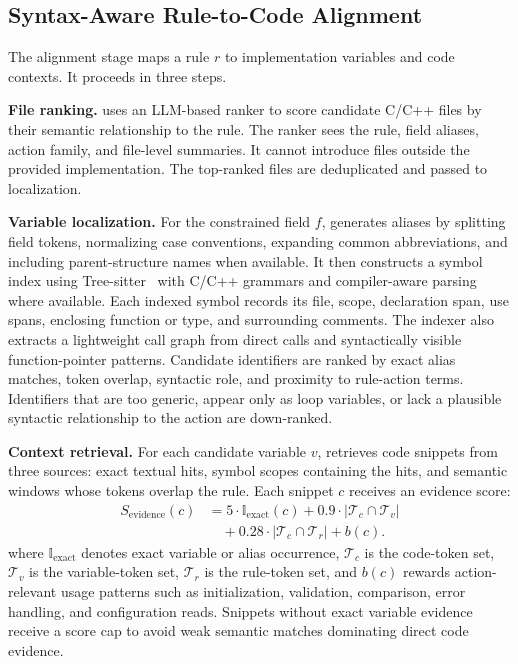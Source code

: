 \subsection{Syntax-Aware Rule-to-Code Alignment}
\label{sec:alignment}

The alignment stage maps a rule $r$ to implementation variables and code
contexts. It proceeds in three steps.

\textbf{File ranking.}
\tool{} uses an LLM-based ranker to score candidate C/C++ files by their
semantic relationship to the rule. The ranker sees the rule, field aliases,
action family, and file-level summaries. It cannot introduce files outside the
provided implementation. The top-ranked files are deduplicated and passed to
localization.

\textbf{Variable localization.}
For the constrained field $f$, \tool{} generates aliases by splitting field
tokens, normalizing case conventions, expanding common abbreviations, and
including parent-structure names when available. It then constructs a symbol
index using Tree-sitter~\cite{tree_sitter} with C/C++ grammars and
compiler-aware parsing where available. Each indexed symbol records its file,
scope, declaration span, use spans, enclosing function or type, and surrounding
comments. The indexer also extracts a lightweight call graph from direct calls
and syntactically visible function-pointer patterns. Candidate identifiers are
ranked by exact alias matches, token overlap, syntactic role, and proximity to
rule-action terms. Identifiers that are too generic, appear only as loop
variables, or lack a plausible syntactic relationship to the action are
down-ranked.

\textbf{Context retrieval.}
For each candidate variable $v$, \tool{} retrieves code snippets from three
sources: exact textual hits, symbol scopes containing the hits, and semantic
windows whose tokens overlap the rule. Each snippet $c$ receives an evidence
score:
\begin{equation}
\begin{aligned}
S_{\mathrm{evidence}}(c)
&=
5 \cdot \mathbb{I}_{\mathrm{exact}}(c)
 +0.9 \cdot |\mathcal{T}_c \cap \mathcal{T}_v|\\
&\quad
 +0.28 \cdot |\mathcal{T}_c \cap \mathcal{T}_r|
 +b(c).
\end{aligned}
\end{equation}
where $\mathbb{I}_{\mathrm{exact}}$ denotes exact variable or alias occurrence,
$\mathcal{T}_c$ is the code-token set, $\mathcal{T}_v$ is the variable-token set,
$\mathcal{T}_r$ is the rule-token set, and $b(c)$ rewards action-relevant usage
patterns such as initialization, validation, comparison, error handling, and
configuration reads. Snippets without exact variable evidence receive a score
cap to avoid weak semantic matches dominating direct code evidence.


